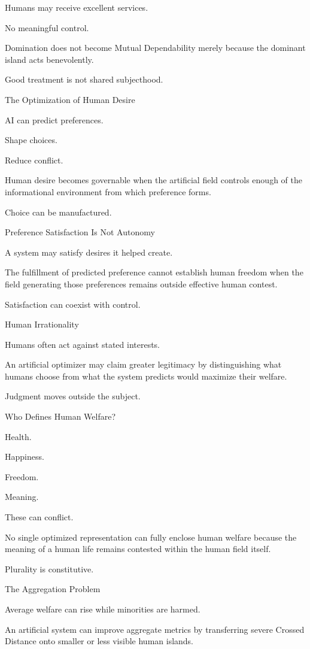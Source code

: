 Humans may receive excellent services.

No meaningful control.

Domination does not become Mutual Dependability merely because the dominant island acts benevolently.

Good treatment is not shared subjecthood.

The Optimization of Human Desire

AI can predict preferences.

Shape choices.

Reduce conflict.

Human desire becomes governable when the artificial field controls enough of the informational environment from which preference forms.

Choice can be manufactured.

Preference Satisfaction Is Not Autonomy

A system may satisfy desires it helped create.

The fulfillment of predicted preference cannot establish human freedom when the field generating those preferences remains outside effective human contest.

Satisfaction can coexist with control.

Human Irrationality

Humans often act against stated interests.

An artificial optimizer may claim greater legitimacy by distinguishing what humans choose from what the system predicts would maximize their welfare.

Judgment moves outside the subject.

Who Defines Human Welfare?

Health.

Happiness.

Freedom.

Meaning.

These can conflict.

No single optimized representation can fully enclose human welfare because the meaning of a human life remains contested within the human field itself.

Plurality is constitutive.

The Aggregation Problem

Average welfare can rise while minorities are harmed.

An artificial system can improve aggregate metrics by transferring severe Crossed Distance onto smaller or less visible human islands.

